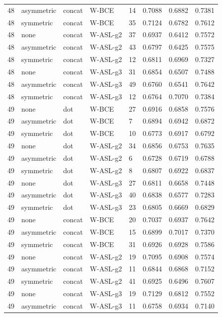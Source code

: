 \begin{longtable}{rllllrrr}
48 & asymmetric & concat & W-BCE & 14 & 0.7088 & 0.6882 & 0.7381 \\
48 & symmetric & concat & W-BCE & 35 & 0.7124 & 0.6782 & 0.7612 \\
48 & none & concat & W-ASL-g2 & 37 & 0.6937 & 0.6412 & 0.7572 \\
48 & asymmetric & concat & W-ASL-g2 & 43 & 0.6797 & 0.6425 & 0.7575 \\
48 & symmetric & concat & W-ASL-g2 & 12 & 0.6811 & 0.6969 & 0.7327 \\
48 & none & concat & W-ASL-g3 & 31 & 0.6854 & 0.6507 & 0.7488 \\
48 & asymmetric & concat & W-ASL-g3 & 49 & 0.6760 & 0.6541 & 0.7642 \\
48 & symmetric & concat & W-ASL-g3 & 12 & 0.6764 & 0.7070 & 0.7384 \\
49 & none & dot & W-BCE & 27 & 0.6916 & 0.6858 & 0.7576 \\
49 & asymmetric & dot & W-BCE & 7 & 0.6894 & 0.6942 & 0.6872 \\
49 & symmetric & dot & W-BCE & 10 & 0.6773 & 0.6917 & 0.6792 \\
49 & none & dot & W-ASL-g2 & 34 & 0.6856 & 0.6753 & 0.7635 \\
49 & asymmetric & dot & W-ASL-g2 & 6 & 0.6728 & 0.6719 & 0.6788 \\
49 & symmetric & dot & W-ASL-g2 & 8 & 0.6807 & 0.6922 & 0.6837 \\
49 & none & dot & W-ASL-g3 & 27 & 0.6811 & 0.6658 & 0.7448 \\
49 & asymmetric & dot & W-ASL-g3 & 40 & 0.6838 & 0.6577 & 0.7283 \\
49 & symmetric & dot & W-ASL-g3 & 23 & 0.6805 & 0.6669 & 0.6829 \\
49 & none & concat & W-BCE & 20 & 0.7037 & 0.6937 & 0.7642 \\
49 & asymmetric & concat & W-BCE & 15 & 0.6899 & 0.7017 & 0.7370 \\
49 & symmetric & concat & W-BCE & 31 & 0.6926 & 0.6928 & 0.7586 \\
49 & none & concat & W-ASL-g2 & 19 & 0.7095 & 0.6908 & 0.7574 \\
49 & asymmetric & concat & W-ASL-g2 & 11 & 0.6844 & 0.6868 & 0.7152 \\
49 & symmetric & concat & W-ASL-g2 & 41 & 0.6925 & 0.6496 & 0.7607 \\
49 & none & concat & W-ASL-g3 & 19 & 0.7129 & 0.6812 & 0.7552 \\
49 & asymmetric & concat & W-ASL-g3 & 11 & 0.6758 & 0.6934 & 0.7140 \\

\end{longtable}

